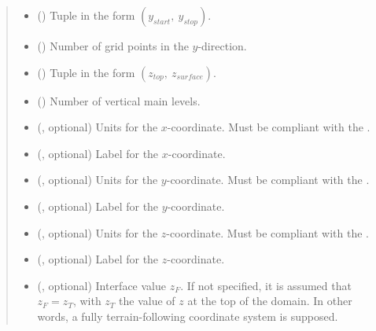 \documentclass[letterpaper,10pt,english]{sphinxmanual}
\begin{document}
\begin{fulllineitems}
\begin{fulllineitems}
\begin{quote}
\begin{description}
\begin{itemize}
\item {} 
 () \textendash{} Tuple in the form \((y_{start}, ~ y_{stop})\).

\item {} 
 () \textendash{} Number of grid points in the \(y\)-direction.

\item {} 
 () \textendash{} Tuple in the form \((z_{top}, ~ z_{surface})\).

\item {} 
 () \textendash{} Number of vertical main levels.

\item {} 
 (, optional) \textendash{} 
Units for the \(x\)-coordinate. Must be compliant with the .


\item {} 
 (, optional) \textendash{} Label for the \(x\)-coordinate.

\item {} 
 (, optional) \textendash{} 
Units for the \(y\)-coordinate. Must be compliant with the .


\item {} 
 (, optional) \textendash{} Label for the \(y\)-coordinate.

\item {} 
 (, optional) \textendash{} 
Units for the \(z\)-coordinate. Must be compliant with the .


\item {} 
 (, optional) \textendash{} Label for the \(z\)-coordinate.

\item {} 
 (, optional) \textendash{} Interface value \(z_F\). If not specified, it is assumed that \(z_F = z_T\), with \(z_T\)
the value of \(z\) at the top of the domain. In other words, a fully terrain-following coordinate
system is supposed.


\end{itemize}
\end{description}
\end{quote}
\end{fulllineitems}
\end{fulllineitems}
\end{document}
